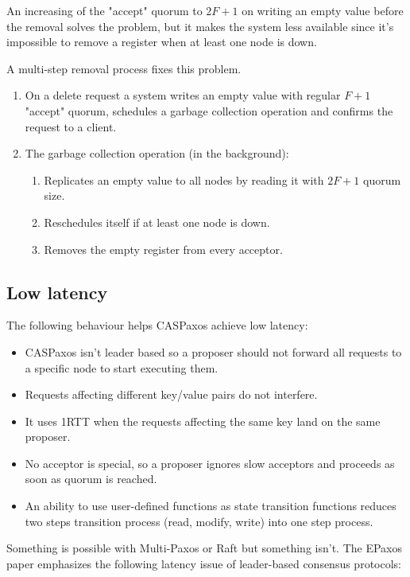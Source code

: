 \documentclass[12pt]{article}
\theoremstyle{definition}
\begin{document}
An increasing of the "accept" quorum to $2F+1$ on writing an empty value before the removal solves the problem, but it makes the system less available since it's impossible to remove a register when at least one node is down.

A multi-step removal process fixes this problem.

\begin{enumerate}
  \item On a delete request a system writes an empty value with regular $F+1$ "accept" quorum, schedules a garbage collection operation and confirms the request to a client.
  \item The garbage collection operation (in the background):
  \begin{enumerate}
    \item Replicates an empty value to all nodes by reading it with $2F+1$ quorum size.
    \item Reschedules itself if at least one node is down.
    \item Removes the empty register from every acceptor.
  \end{enumerate}
\end{enumerate}

\newpage

\subsection{Low latency}

The following behaviour helps CASPaxos achieve low latency:
\begin{itemize}[noitemsep]
  \item CASPaxos isn't leader based so a proposer should not forward all requests to a specific node to start executing them.
  \item Requests affecting different key/value pairs do not interfere.
  \item It uses 1RTT when the requests affecting the same key land on the same proposer.
  \item No acceptor is special, so a proposer ignores slow acceptors and proceeds as soon as quorum is reached.
  \item An ability to use user-defined functions as state transition functions reduces two steps transition process (read, modify, write) into one step process.
\end{itemize}

Something is possible with Multi-Paxos or Raft but something isn't. The EPaxos paper emphasizes the following latency issue of leader-based consensus protocols:
\end{document}
